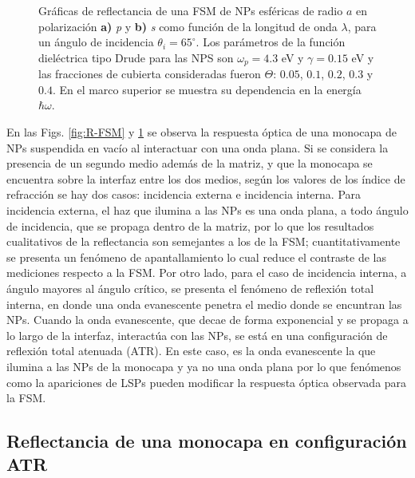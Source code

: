 \documentclass[letterpaper,11pt] {article}
\begin{document}
\begin{figure}[t!]
	\caption{Gráficas de reflectancia de una FSM de NPs esféricas de radio $a$ en polarización \textbf{a)} \emph{p} y \textbf{b)} \emph{s} como función de la longitud de onda $\lambda$, para un ángulo de incidencia $\theta_i =65^\circ$. Los parámetros de la función dieléctrica tipo Drude para las NPS son $\omega_p = 4.3$ eV y $\gamma = 0.15$ eV y las fracciones de cubierta consideradas fueron $\Theta$: $0. 05$, $0. 1$, $0. 2$, $0. 3$ y $0. 4$.  En el marco superior se muestra su dependencia en la energía $\hbar\omega$.}\label{fig:FSM-Cuts}
	\end{figure}	

En las Figs. \ref{fig:R-FSM} y \ref{fig:FSM-Cuts} se observa la respuesta óptica de una monocapa de NPs suspendida en vacío al interactuar con una onda plana. Si se considera la presencia de un segundo medio además de la matriz, y que la monocapa se encuentra sobre la interfaz entre los dos medios, según los valores de los índice de refracción se hay dos casos: incidencia externa e incidencia interna. Para incidencia externa, el haz que ilumina a las NPs es una onda plana, a todo ángulo de incidencia, que se propaga dentro de la matriz, por lo que los resultados cualitativos de la reflectancia son semejantes a los de la FSM; cuantitativamente se presenta un fenómeno de apantallamiento lo cual reduce el contraste de las mediciones respecto a la FSM. Por otro lado, para el caso de incidencia interna, a ángulo mayores al ángulo crítico, se presenta el fenómeno de reflexión total interna, en donde una onda evanescente penetra el medio donde se encuntran las NPs. Cuando la onda evanescente, que decae de forma exponencial y se propaga a lo largo de la interfaz, interactúa con las NPs, se está en una configuración de reflexión total atenuada (ATR). En este caso, es la onda evanescente la que ilumina a las NPs de la monocapa y ya no una onda plana por lo que fenómenos como la apariciones de LSPs pueden modificar la respuesta óptica observada para la FSM.

				
				
	\subsection{Reflectancia de una monocapa en configuración ATR}
%
\end{document}
